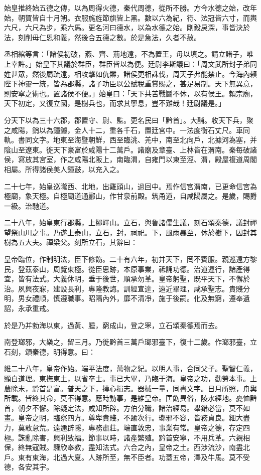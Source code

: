 \begin{pinyinscope}
始皇推終始五德之傳，以為周得火德，秦代周德，從所不勝。方今水德之始，改年始，朝賀皆自十月朔。衣服旄旌節旗皆上黑。數以六為紀，符、法冠皆六寸，而輿六尺，六尺為步，乘六馬。更名河曰德水，以為水德之始。剛毅戾深，事皆決於法，刻削毋仁恩和義，然後合五德之數。於是急法，久者不赦。

丞相綰等言：「諸侯初破，燕、齊、荊地遠，不為置王，毋以填之。請立諸子，唯上幸許。」始皇下其議於群臣，群臣皆以為便。廷尉李斯議曰：「周文武所封子弟同姓甚眾，然後屬疏遠，相攻擊如仇讎，諸侯更相誅伐，周天子弗能禁止。今海內賴陛下神靈一統，皆為郡縣，諸子功臣以公賦稅重賞賜之，甚足易制。天下無異意，則安寧之術也。置諸侯不便。」始皇曰：「天下共苦戰鬬不休，以有侯王。賴宗廟，天下初定，又復立國，是樹兵也，而求其寧息，豈不難哉！廷尉議是。」

分天下以為三十六郡，郡置守、尉、監。更名民曰「黔首」。大酺。收天下兵，聚之咸陽，銷以為鐘鐻，金人十二，重各千石，置廷宮中。一法度衡石丈尺。車同軌。書同文字。地東至海暨朝鮮，西至臨洮、羌中，南至北向戶，北據河為塞，并陰山至遼東。徙天下豪富於咸陽十二萬戶。諸廟及章臺、上林皆在渭南。秦每破諸侯，寫放其宮室，作之咸陽北阪上，南臨渭，自雍門以東至涇、渭，殿屋複道周閣相屬。所得諸侯美人鐘鼓，以充入之。

二十七年，始皇巡隴西、北地，出雞頭山，過回中。焉作信宮渭南，已更命信宮為極廟，象天極。自極廟道通酈山，作甘泉前殿。筑甬道，自咸陽屬之。是歲，賜爵一級。治馳道。

二十八年，始皇東行郡縣，上鄒嶧山。立石，與魯諸儒生議，刻石頌秦德，議封禪望祭山川之事。乃遂上泰山，立石，封，祠祀。下，風雨暴至，休於樹下，因封其樹為五大夫。禪梁父。刻所立石，其辭曰：

皇帝臨位，作制明法，臣下修飭。二十有六年，初并天下，罔不賓服。親巡遠方黎民，登茲泰山，周覽東極。從臣思跡，本原事業，祗誦功德。治道運行，諸產得宜，皆有法式。大義休明，垂于後世，順承勿革。皇帝躬聖，既平天下，不懈於治。夙興夜寐，建設長利，專隆教誨。訓經宣達，遠近畢理，咸承聖志。貴賤分明，男女禮順，慎遵職事。昭隔內外，靡不清凈，施于後嗣。化及無窮，遵奉遺詔，永承重戒。

於是乃并勃海以東，過黃、腄，窮成山，登之罘，立石頌秦德焉而去。

南登瑯邪，大樂之，留三月。乃徙黔首三萬戶瑯邪臺下，復十二歲。作瑯邪臺，立石刻，頌秦德，明得意。曰：

維二十八年，皇帝作始。端平法度，萬物之紀。以明人事，合同父子。聖智仁義，顯白道理。東撫東土，以省卒士。事已大畢，乃臨于海。皇帝之功，勸勞本事。上農除末，黔首是富。普天之下，摶心揖志。器械一量，同書文字。日月所照，舟輿所載。皆終其命，莫不得意。應時動事，是維皇帝。匡飭異俗，陵水經地。憂恤黔首，朝夕不懈。除疑定法，咸知所辟。方伯分職，諸治經易。舉錯必當，莫不如畫。皇帝之明，臨察四方。尊卑貴賤，不踰次行。瑯邪不容，皆務貞良。細大盡力，莫敢怠荒。遠邇辟隱，專務肅莊。端直敦忠，事業有常。皇帝之德，存定四極。誅亂除害，興利致福。節事以時，諸產繁殖。黔首安寧，不用兵革。六親相保，終無寇賊。驩欣奉教，盡知法式。六合之內，皇帝之土。西涉流沙，南盡北戶。東有東海，北過大夏。人跡所至，無不臣者。功蓋五帝，澤及牛馬。莫不受德，各安其宇。


\end{pinyinscope}
